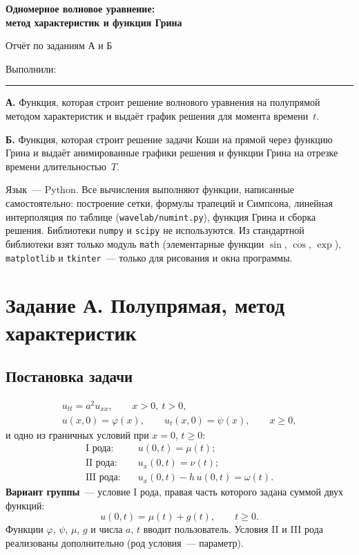 \documentclass[a4paper,12pt]{article}
\newcommand{\code}[1]{\texttt{#1}}
\begin{document}
\begin{center}
  {\Large\bfseries Одномерное волновое уравнение:\\[2pt]
   метод характеристик и функция Грина\par}
  \vspace{6pt}
  {Отчёт по заданиям А и Б\par}
  \vspace{4pt}
  {Выполнили: \rule{8cm}{0.4pt}\par}
\end{center}

\noindent\textbf{А.} Функция, которая строит решение волнового уравнения на
полупрямой методом характеристик и выдаёт график решения для момента времени~$t$.

\noindent\textbf{Б.} Функция, которая строит решение задачи Коши на прямой через
функцию Грина и выдаёт анимированные графики решения и функции Грина на отрезке
времени длительностью~$T$.

Язык~--- Python. Все вычисления выполняют функции, написанные самостоятельно:
построение сетки, формулы трапеций и Симпсона, линейная интерполяция по таблице
(\code{wavelab/numint.py}), функция Грина и сборка решения. Библиотеки
\code{numpy} и \code{scipy} не используются. Из стандартной библиотеки взят
только модуль \code{math} (элементарные функции $\sin$, $\cos$, $\exp$),
\code{matplotlib} и \code{tkinter}~--- только для рисования и окна программы.

\section{Задание А. Полупрямая, метод характеристик}

\subsection{Постановка задачи}

\begin{equation}\label{eq:A}
\begin{gathered}
  u_{tt}=a^{2}u_{xx},\qquad x>0,\ t>0,\\
  u(x,0)=\varphi(x),\qquad u_t(x,0)=\psi(x),\qquad x\ge 0,
\end{gathered}
\end{equation}
и одно из граничных условий при $x=0$, $t\ge 0$:
\begin{align*}
  \text{I рода:}\quad   & u(0,t)=\mu(t);\\
  \text{II рода:}\quad  & u_x(0,t)=\nu(t);\\
  \text{III рода:}\quad & u_x(0,t)-h\,u(0,t)=\omega(t).
\end{align*}
\textbf{Вариант группы}~--- условие I рода, правая часть которого задана суммой
двух функций:
\begin{equation}\label{eq:variant}
  u(0,t)=\mu(t)+g(t),\qquad t\ge 0 .
\end{equation}
Функции $\varphi$, $\psi$, $\mu$, $g$ и числа $a$, $t$ вводит пользователь.
Условия II и III рода реализованы дополнительно (род условия~--- параметр).
\end{document}

